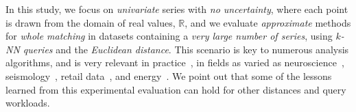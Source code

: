 {\color{blue}
In this study, we focus on \emph{univariate} series with \emph{no uncertainty}, where each point is drawn from the domain of real values, $\mathbb{R}$, and we evaluate \emph{approximate} methods for \emph{whole matching} in datasets containing a \emph{very large number of series}, using \emph{$k$-NN queries} and the \emph{Euclidean distance}. This scenario is key to numerous analysis algorithms, and is very relevant in practice~\cite{journal/pattrecog/Warren2005,conf/kdd/Zoumpatianos2015,conf/sofsem/Palpanas2016}, in fields as varied as neuroscience~\cite{golay1998new}, seismology~\cite{kakizawa1998discrimination}, retail data~\cite{DBLP:conf/kdd/KumarPW02}, and energy~\cite{kovsmelj1990cross}. We point out that some of the lessons learned from this experimental evaluation can hold for other distances and query workloads.
}



